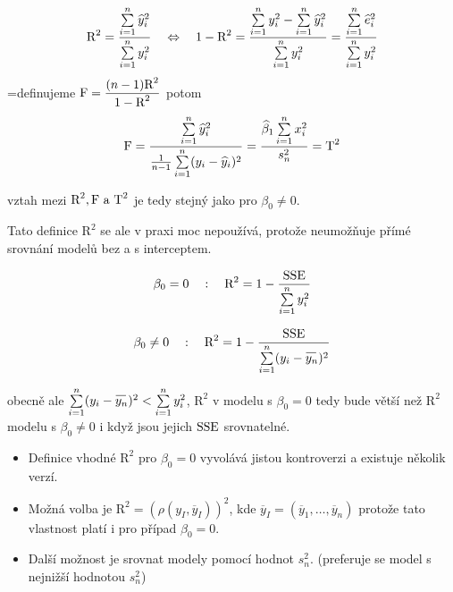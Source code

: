 $$ 
  \text{R}^{2} = \dfrac{\sum\limits_{i=1}^{n} \widehat{y}_i^{2}}{\sum\limits_{i=1}^{n} y_i^{2}} \quad \Leftrightarrow \quad
  1 - \text{R}^{2} = \dfrac{\sum\limits_{i=1}^{n} y_i^{2} - \sum\limits_{i=1}^{n} \widehat{y}_i^{2}}{\sum\limits_{i=1}^{n} y_i^{2}} = \dfrac{\sum\limits_{i=1}^{n} \widehat{e}_i^{2}}{\sum\limits_{i=1}^{n} y_i^{2} }
$$
=definujeme $ \mathrm{F} = \dfrac{(n-1) \text{R}^{2}}{1 - \text{R}^{2}} $ potom 
$$ 
  \mathrm{F} = \dfrac{\sum\limits_{i=1}^{n} \widehat{y}_i^{2} }{\frac{1}{n-1} \sum\limits_{i=1}^{n} ( y_i - \widehat{y}_i )^{2} } = \dfrac{\widehat{\beta}_{1} \sum\limits_{i=1}^{n} x_i^{2} }{ s_n^{2}}= \text{T}^{2}
$$

vztah mezi $ \text{R}^{2}, \mathrm{F} \text{ a T}^{2} $ je tedy stejný jako pro $ \beta_0 \neq 0 $.

\begin{remark}
  Tato definice $ \text{R}^{2} $ se ale v praxi moc nepoužívá, protože neumožňuje přímé srovnání modelů bez a s interceptem.
\end{remark}

\noindent\begin{minipage}{.5\linewidth}
$$
  \beta_0 = 0 \quad : \quad \text{R}^{2} = 1 - \dfrac{\mathrm{SSE}}{\sum\limits_{i=1}^{n} y_i^{2}}
$$
\end{minipage}%
\begin{minipage}{.5\linewidth}
$$
  \beta_0 \neq 0 \quad : \quad \text{R}^{2} = 1 - \dfrac{\SSE}{\sumin (y_i - \oynn)^{2}}
$$
\end{minipage}

obecně ale $ \sumin (y_i - \oynn)^{2} < \sumin y_i^{2} $, $ \text{R}^{2} $ v modelu s $ \beta_0 = 0 $ tedy bude větší než $ \text{R}^{2} $ modelu s $ \beta_0 \neq 0 $ i když jsou jejich $ \mathrm{SSE} $ srovnatelné.

\begin{itemize}
  \item Definice vhodné $ \text{R}^{2} $ pro $ \beta_0 = 0 $ vyvolává jistou kontroverzi a existuje několik verzí.
  \item Možná volba je $ \text{R}^{2} = ( \rho (y_I, \overline{y}_{I}  ))^{2} $, kde $ \overline{y}_{I} = ( \overline{y}_{1},\dots ,\overline{y}_{n}) $ protože tato vlastnost platí i pro případ $ \beta_0 = 0 $.
  \item Další možnost je srovnat modely pomocí hodnot $ s_n^{2} $. (preferuje se model s nejnižší hodnotou $ s_n^{2} $)
\end{itemize}